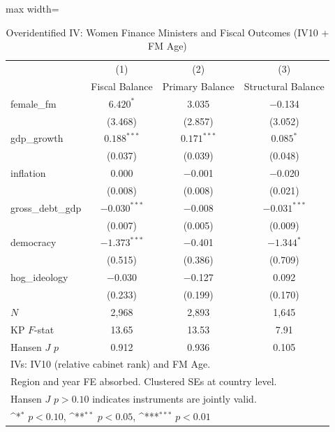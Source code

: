 \begin{table}[htbp]\centering
\def\sym#1{\ifmmode^{#1}\else\(^{#1}\)\fi}
\caption{Overidentified IV: Women Finance Ministers and Fiscal Outcomes (IV10 + FM Age)}
\label{tab:iv_overid}
\begin{adjustbox}{max width=\textwidth}
\small
\begin{tabular}{l*{3}{c}}
\hline\hline
            &\multicolumn{1}{c}{(1)}&\multicolumn{1}{c}{(2)}&\multicolumn{1}{c}{(3)}\\
            &\multicolumn{1}{c}{Fiscal Balance}&\multicolumn{1}{c}{Primary Balance}&\multicolumn{1}{c}{Structural Balance}\\
\hline
female\_fm   & $6.420^{*}$ & 3.035 & $-$0.134 \\
            & (3.468) & (2.857) & (3.052) \\[0.5em]
gdp\_growth  & $0.188^{***}$ & $0.171^{***}$ & $0.085^{*}$ \\
            & (0.037) & (0.039) & (0.048) \\[0.5em]
inflation   & 0.000 & $-$0.001 & $-$0.020 \\
            & (0.008) & (0.008) & (0.021) \\[0.5em]
gross\_debt\_gdp & $-0.030^{***}$ & $-$0.008 & $-0.031^{***}$ \\
            & (0.007) & (0.005) & (0.009) \\[0.5em]
democracy   & $-1.373^{***}$ & $-$0.401 & $-1.344^{*}$ \\
            & (0.515) & (0.386) & (0.709) \\[0.5em]
hog\_ideology & $-$0.030 & $-$0.127 & 0.092 \\
            & (0.233) & (0.199) & (0.170) \\
\hline
\(N\)       & 2,968 & 2,893 & 1,645 \\
KP $F$-stat & 13.65 & 13.53 & 7.91 \\
Hansen $J$ $p$ & 0.912 & 0.936 & 0.105 \\
\hline\hline
\multicolumn{4}{l}{\footnotesize IVs: IV10 (relative cabinet rank) and FM Age.}\\
\multicolumn{4}{l}{\footnotesize Region and year FE absorbed. Clustered SEs at country level.}\\
\multicolumn{4}{l}{\footnotesize Hansen $J$ $p>0.10$ indicates instruments are jointly valid.}\\
\multicolumn{4}{l}{\footnotesize \sym{*} \(p<0.10\), \sym{**} \(p<0.05\), \sym{***} \(p<0.01\)}\\
\end{tabular}
\end{adjustbox}
\end{table}
